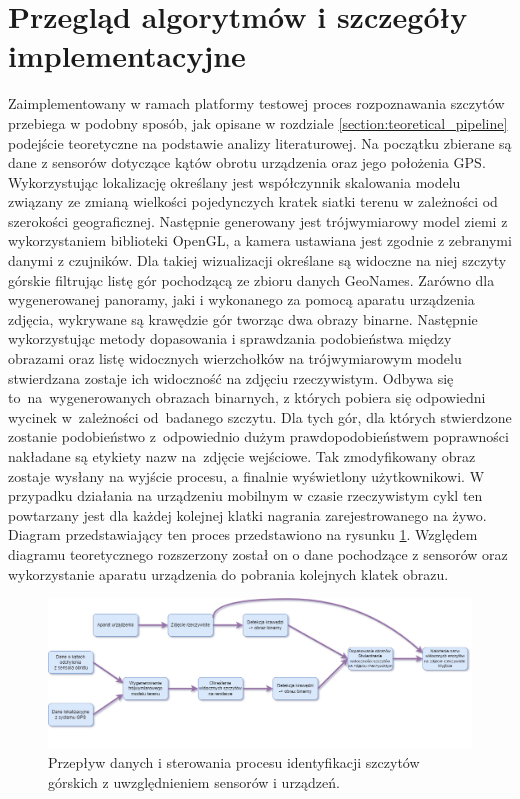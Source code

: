 \newpage

\section{Przegląd algorytmów i szczegóły implementacyjne}

Zaimplementowany w ramach platformy testowej proces rozpoznawania szczytów przebiega w podobny sposób, jak opisane w rozdziale \ref{section:teoretical_pipeline} podejście teoretyczne na podstawie analizy literaturowej. Na początku zbierane są dane z sensorów dotyczące kątów obrotu urządzenia oraz jego położenia GPS. Wykorzystując lokalizację określany jest współczynnik skalowania modelu związany ze zmianą wielkości pojedynczych kratek siatki terenu w zależności od szerokości geograficznej. Następnie generowany jest trójwymiarowy model ziemi z wykorzystaniem biblioteki OpenGL, a kamera ustawiana jest zgodnie z zebranymi danymi z czujników. Dla takiej wizualizacji określane są widoczne na niej szczyty górskie filtrując listę gór pochodzącą ze zbioru danych GeoNames. Zarówno dla wygenerowanej panoramy, jaki i wykonanego za pomocą aparatu urządzenia zdjęcia, wykrywane są krawędzie gór tworząc dwa obrazy binarne. Następnie wykorzystując metody dopasowania i sprawdzania podobieństwa między obrazami oraz listę widocznych wierzchołków na trójwymiarowym modelu stwierdzana zostaje ich widoczność na zdjęciu rzeczywistym. Odbywa się to~na~wygenerowanych obrazach binarnych, z których pobiera się odpowiedni wycinek w~zależności od~badanego szczytu. Dla tych gór, dla których stwierdzone zostanie podobieństwo z~odpowiednio dużym prawdopodobieństwem poprawności nakładane są etykiety nazw na~zdjęcie wejściowe. Tak zmodyfikowany obraz zostaje wysłany na wyjście procesu, a finalnie wyświetlony użytkownikowi. W przypadku działania na urządzeniu mobilnym w czasie rzeczywistym cykl ten powtarzany jest dla każdej kolejnej klatki nagrania zarejestrowanego na żywo. Diagram przedstawiający ten proces przedstawiono na rysunku \ref{fig:practical-pipeline}. Względem diagramu teoretycznego rozszerzony został on o dane pochodzące z sensorów oraz wykorzystanie aparatu urządzenia do pobrania kolejnych klatek obrazu.

\vspace{3em}

\begin{figure}[!h]
    \centering \includegraphics[width=1.0\linewidth]{img/flowchart_cale.drawio.png}
    \caption{Przepływ danych i sterowania procesu identyfikacji szczytów górskich z uwzględnieniem sensorów i urządzeń.}
    \label{fig:practical-pipeline}
\end{figure}


